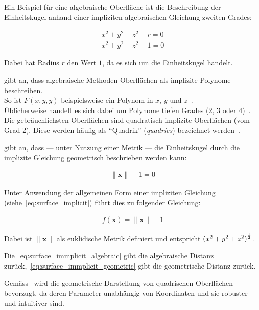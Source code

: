 Ein Beispiel für eine algebraische Oberfläche ist die Beschreibung der
Einheitskugel anhand einer impliziten algebraischen Gleichung zweiten Grades:

\begin{gather} \label{eq:surface_immplicit_algebraic}
    x^{2} + y^{2} + z^{2} - r = 0\\
    x^{2} + y^{2} + z^{2} - 1 = 0
\end{gather}

Dabei hat Radius $r$ den Wert $1$, da es sich um die Einheitskugel
handelt.

\citeauthor{menon_introduction_1996} gibt an, dass algebraische Methoden
Oberflächen als implizite Polynome beschreiben.\\
So ist $F(x, y, y)$ beispielsweise ein Polynom in $x$, $y$ und
$z$~\parencite[S.  2]{menon_introduction_1996}.\\
Üblicherweise handelt es sich dabei um Polynome tiefen Grades (2, 3 oder
4)~\parencite[S.  2]{menon_introduction_1996}.\\
Die gebräuchlichsten Oberflächen sind quadratisch implizite Oberflächen
(vom Grad 2). Diese werden häufig als ``Quadrik'' (\textit{quadrics})
bezeichnet werden~\parencite[S.  2]{menon_introduction_1996}.

\citeauthor{hart_sphere_1994} gibt an, dass --- unter Nutzung einer Metrik ---
die Einheitskugel durch die implizite Gleichung geometrisch beschrieben
werden kann:

\begin{gather}\label{eq:surface_immplicit_geometric}
    \|\bm{x}\| - 1 = 0
\end{gather}

Unter Anwendung der allgemeinen Form einer impliziten Gleichung
(siehe~\ref{eq:surface_implicit}) führt dies zu folgender Gleichung:

\begin{gather}\label{eq:surface_implicit_sphere}
    f(\bm{x}) = \|\bm{x}\| - 1
\end{gather}


Dabei ist $\|\bm{x}\|$ als euklidische Metrik definiert und entspricht
${(x^{2} + y^{2} + z^{2})}^{1 \over 2}$.

Die~\autoref{eq:surface_immplicit_algebraic} gibt die algebraische
Distanz zurück,~\autoref{eq:surface_immplicit_geometric} gibt die
geometrische Distanz zurück.

Gemäss~\citeauthor{hart_sphere_1994} wird die geometrische Darstellung
von quadrischen Oberflächen bevorzugt, da deren Parameter unabhängig von
Koordinaten und sie robuster und intuitiver sind.

